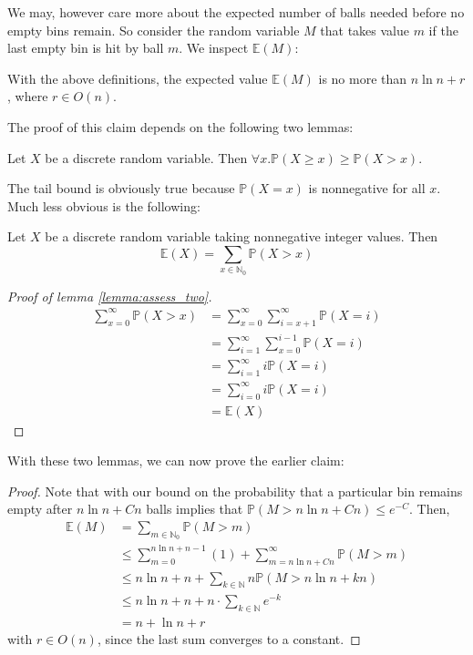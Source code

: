 		We may, however care more about the expected number of balls needed before no empty bins remain. So consider the random 
		variable $M$ that takes value $m$ if the last empty bin is hit by ball $m$. We inspect $\mathbb{E}(M)$:
		\begin{claim}
			With the above definitions, the expected value $\mathbb{E}(M)$ is no more than $n \ln n + r$, where $r \in O(n)$.
		\end{claim}
		The proof of this claim depends on the following two lemmas:
		\begin{lemma}
			Let $X$ be a discrete random variable. Then $\forall x. \mathbb{P}(X \geq x) \geq \mathbb{P}(X > x)$.
		\end{lemma}
		The tail bound is obviously true because $\mathbb{P}(X=x)$ is nonnegative for all $x$. Much less obvious is the following:

		\begin{lemma}
			\label{lemma:assess_two}
			Let $X$ be a discrete random variable taking nonnegative integer values. Then 
			$$
				\mathbb{E}(X) = \sum_{x \in \mathbb{N}_0} \mathbb{P}(X > x)
			$$
		\end{lemma}
		\begin{proof}[Proof of lemma \ref{lemma:assess_two}]
			\begin{align*}
				\sum_{x=0}^{\infty}\mathbb{P}(X > x) &= \sum_{x=0}^{\infty} \sum_{i=x+1}^{\infty} \mathbb{P}(X=i)\\
				                                     &= \sum_{i=1}^{\infty} \sum_{x=0}^{i-1} \mathbb{P}(X=i) \\
								     &= \sum_{i=1}^{\infty} i \mathbb{P}(X=i) \\
								     &= \sum_{i=0}^{\infty} i \mathbb{P}(X=i) \\
				                                     &= \mathbb{E}(X)
			\end{align*}
		\end{proof}
		With these two lemmas, we can now prove the earlier claim:
		\begin{proof}
			Note that with our bound on the probability that a particular bin remains empty after $n \ln n + Cn$ balls implies that
			$\mathbb{P}(M > n \ln n + Cn) \leq e^{-C}$. Then, 
			\begin{align*} 
				\mathbb{E}(M) &= \sum_{m \in \mathbb{N}_0}\mathbb{P}(M > m) \\
				              &\leq \sum_{m = 0}^{n\ln n + n -  1} (1) + \sum_{m = n \ln n + Cn}^{\infty}\mathbb{P}(M>m) \\
					      &\leq n \ln n + n + \sum_{k\in \mathbb{N}} n \mathbb{P}(M > n \ln n + kn) \\
					      &\leq n \ln n + n + n\cdot \sum_{k \in \mathbb{N}} e^{-k} \\
					      &= n + \ln n + r
			\end{align*}
			with $r\in O(n)$, since the last sum converges to a constant.
		\end{proof}

